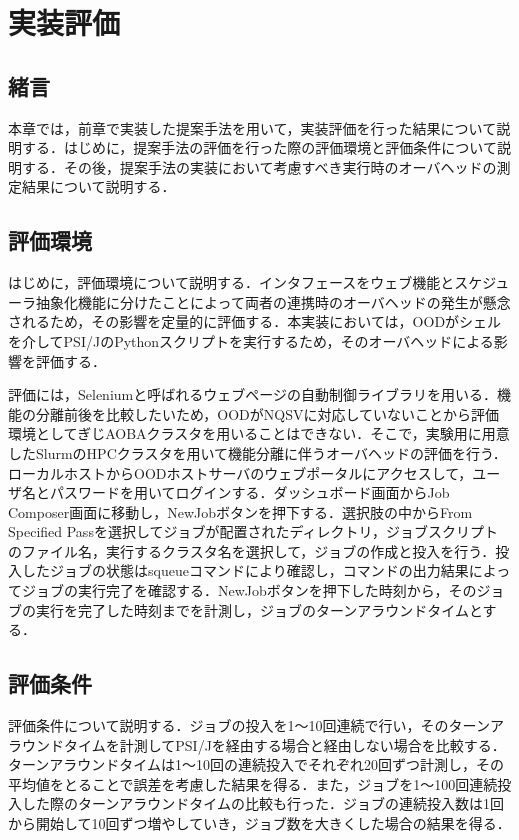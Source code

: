 \section{実装評価}
\subsection{緒言}
本章では，前章で実装した提案手法を用いて，実装評価を行った結果について説明する．はじめに，提案手法の評価を行った際の評価環境と評価条件について説明する．その後，提案手法の実装において考慮すべき実行時のオーバヘッドの測定結果について説明する．\par

\subsection{評価環境}
はじめに，評価環境について説明する．インタフェースをウェブ機能とスケジューラ抽象化機能に分けたことによって両者の連携時のオーバヘッドの発生が懸念されるため，その影響を定量的に評価する．本実装においては，OODがシェルを介してPSI/JのPythonスクリプトを実行するため，そのオーバヘッドによる影響を評価する．\par
評価には，Seleniumと呼ばれるウェブページの自動制御ライブラリを用いる．機能の分離前後を比較したいため，OODがNQSVに対応していないことから評価環境としてぎじAOBAクラスタを用いることはできない．そこで，実験用に用意したSlurmのHPCクラスタを用いて機能分離に伴うオーバヘッドの評価を行う．ローカルホストからOODホストサーバのウェブポータルにアクセスして，ユーザ名とパスワードを用いてログインする．ダッシュボード画面からJob Composer画面に移動し，NewJobボタンを押下する．選択肢の中からFrom Specified Passを選択してジョブが配置されたディレクトリ，ジョブスクリプトのファイル名，実行するクラスタ名を選択して，ジョブの作成と投入を行う．投入したジョブの状態はsqueueコマンドにより確認し，コマンドの出力結果によってジョブの実行完了を確認する．NewJobボタンを押下した時刻から，そのジョブの実行を完了した時刻までを計測し，ジョブのターンアラウンドタイムとする．\par

\subsection{評価条件}
評価条件について説明する．ジョブの投入を1～10回連続で行い，そのターンアラウンドタイムを計測してPSI/Jを経由する場合と経由しない場合を比較する．ターンアラウンドタイムは1～10回の連続投入でそれぞれ20回ずつ計測し，その平均値をとることで誤差を考慮した結果を得る．また，ジョブを1～100回連続投入した際のターンアラウンドタイムの比較も行った．ジョブの連続投入数は1回から開始して10回ずつ増やしていき，ジョブ数を大きくした場合の結果を得る．\par


